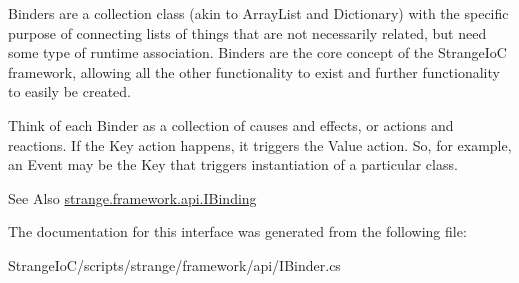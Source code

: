 Binders are a collection class (akin to Array\-List and Dictionary) with the specific purpose of connecting lists of things that are not necessarily related, but need some type of runtime association. Binders are the core concept of the Strange\-Io\-C framework, allowing all the other functionality to exist and further functionality to easily be created.

Think of each Binder as a collection of causes and effects, or actions and reactions. If the Key action happens, it triggers the Value action. So, for example, an Event may be the Key that triggers instantiation of a particular class.

\begin{DoxySeeAlso}{See Also}
\hyperlink{interfacestrange_1_1framework_1_1api_1_1_i_binding}{strange.\-framework.\-api.\-I\-Binding} 
\end{DoxySeeAlso}


The documentation for this interface was generated from the following file\-:\begin{DoxyCompactItemize}
\item 
Strange\-Io\-C/scripts/strange/framework/api/I\-Binder.\-cs\end{DoxyCompactItemize}
